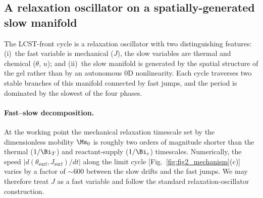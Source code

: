 
\subsection{A relaxation oscillator on a spatially-generated slow
manifold}
\label{sec:lcst_front_mechanism}

The LCST-front cycle is a relaxation oscillator with two distinguishing
features: (i)~the fast variable is mechanical ($J$), the slow
variables are thermal and chemical ($\theta$, $u$); and (ii)~the
slow manifold is generated by the spatial structure of the gel rather
than by an autonomous 0D nonlinearity.  Each cycle traverses two
stable branches of this manifold connected by fast jumps, and the
period is dominated by the slowest of the four phases.

\paragraph{Fast--slow decomposition.}  At the working point the
mechanical relaxation timescale set by the dimensionless mobility
$\Ms_0$ is roughly two orders of magnitude shorter than the thermal
($1/\Bi_T$) and reactant-supply ($1/\Bi_c$) timescales.  Numerically,
the speed $|d(\theta_\mathrm{surf}, J_\mathrm{surf})/dt|$ along the
limit cycle [Fig.~\ref{fig:fig2_mechanism}(c)] varies by a factor of
$\sim\!600$ between the slow drifts and the fast jumps.  We may
therefore treat $J$ as a fast variable and follow the standard
relaxation-oscillator construction.

